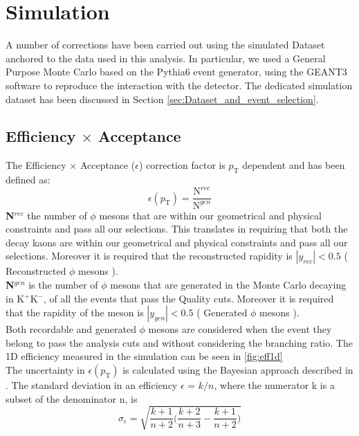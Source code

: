 \section{Simulation}
\label{sec:Simulation}
A number of corrections have been carried out using the simulated Dataset anchored to the data used in this analysis. In particular, we used a General Purpose Monte Carlo based on the Pythia6 event generator, using the GEANT3 software to reproduce the interaction with the detector. The dedicated simulation dataset has been discussed in Section \ref{sec:Dataset_and_event_selection}.\\

\subsection{Efficiency $\times$ Acceptance}
The Efficiency $\times$ Acceptance ($\epsilon$) correction factor is $p_{\text{T}}$ dependent and has been defined as:
\begin{equation}
\epsilon(p_{\text{T}}) = \frac{\text{N}^{rec}}{\text{N}^{gen}}
\label{eq:eff}
\end{equation}
\textbf{N$^{rec}$} the number of $\phi$ mesons that are within our geometrical and physical constraints and pass all our selections. This translates in requiring that both the decay kaons are within our geometrical and physical constraints and pass all our selections. Moreover it is required that the reconstructed rapidity is $|y_{rec}|<0.5$ ( Reconstructed $\phi$ mesons ).\\
\textbf{N$^{gen}$} is the number of $\phi$ mesons that are generated in the Monte Carlo decaying in K$^+$K$^-$, of all the events that pass the Quality cuts. Moreover it is required that the rapidity of the meson is $|y_{gen}|<0.5$ ( Generated $\phi$ mesons ).\\
Both recordable and generated $\phi$ mesons are considered when the event they belong to pass the analysis cuts and without considering the branching ratio. The 1D efficiency measured in the simulation can be seen in \ref{fig:eff1d}\\
The uncertainty in $\epsilon(p_{\text{T}})$ is calculated using the Bayesian approach described in \cite{ErrEff}. The standard deviation in an efficiency $\epsilon$ = $k/n$, where the numerator k is a subset of the denominator n, is
\begin{equation}
\sigma_{\epsilon}=\sqrt{\frac{k+1}{n+2}\Big( \frac{k+2}{n+3} - \frac{k+1}{n+2} \Big)}
\end{equation}
